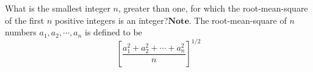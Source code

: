 What is the smallest integer $n$,  greater than one, for which the root-mean-square of the first $n$ positive integers is an integer?$\mathbf{Note.}$ The root-mean-square of $n$ numbers $a_1, a_2, \cdots, a_n$ is defined to be\[\left[\frac{a_1^2 + a_2^2 + \cdots + a_n^2}n\right]^{1/2}\]